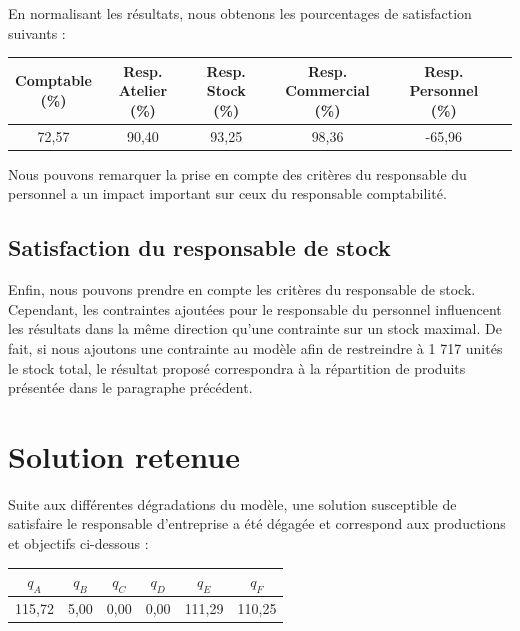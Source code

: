 \documentclass[paper=a4, fontsize=11pt]{report}
\numberwithin{equation}{section}		%
\numberwithin{figure}{section}			%
\numberwithin{table}{section}				%
\begin{document}
En normalisant les résultats, nous obtenons les pourcentages de satisfaction suivants : 

\begin{table}[H]
\begin{center}
\begin{tabular}{c|ccccc}
\shortstack{Comptable \\ \scriptsize{(\%)}} & \shortstack{Resp. Atelier \\ \scriptsize (\%)} & \shortstack{Resp.  Stock \\ \scriptsize (\%)} & \shortstack{Resp.  Commercial \\ \scriptsize (\%)} &   \shortstack{Resp.  Personnel \\ \scriptsize (\%)} \\ 
\hline 
72,57 & 90,40 & 93,25 & 98,36 & -65,96 \\
\end{tabular}
\end{center}
\end{table}

Nous pouvons remarquer la prise en compte des critères du responsable du personnel a un impact important sur ceux du responsable comptabilité.

\subsection{Satisfaction du responsable de stock}

Enfin, nous pouvons prendre en compte les critères du responsable de stock. Cependant, les contraintes ajoutées pour le responsable du personnel influencent les résultats dans la même direction qu'une contrainte sur un stock maximal. De fait, si nous ajoutons une contrainte au modèle afin de restreindre à 1 717 unités le stock total, le résultat proposé correspondra à la répartition de produits présentée dans le paragraphe précédent.

\section{Solution retenue}

Suite aux différentes dégradations du modèle, une solution susceptible de satisfaire le responsable d'entreprise a été dégagée et correspond aux productions et objectifs ci-dessous :

\begin{center}
\begin{tabular}{cccccc}
\hline
$q_A$ & $q_B$ & $q_C$ & $q_D$ & $q_E$ & $q_F$ \\
\hline
115,72 & 5,00 & 0,00 & 0,00 & 111,29 & 110,25 \\
\hline
\end{tabular}
\end{center}
\end{document}
